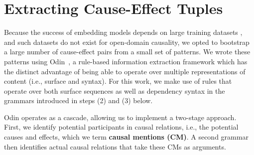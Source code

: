 
\section{Extracting Cause-Effect Tuples}
\label{sec-emnlp2016:causalextraction}


Because the success of embedding models depends on large training datasets \cite{sharp2015spinning}, and such datasets do not exist for open-domain causality, we opted to bootstrap a large number of cause-effect pairs from a small set of patterns.
%
We wrote these patterns using Odin~\cite{valenzuela2016runes}, a rule-based information extraction framework which has the distinct advantage of 
being able to operate over multiple representations of content (i.e., surface and syntax).
For this work, we make use of rules that operate over both surface sequences as well as dependency syntax in the grammars introduced in steps (2) and (3) below.

Odin operates as a cascade, %
allowing us to implement a two-stage approach.
First, we identify potential participants in causal relations, i.e., the potential causes and effects, which we term {\bf causal mentions (CM)}. A second grammar then identifies actual causal relations that take these CMs as arguments.

